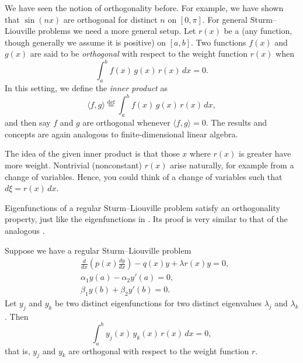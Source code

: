 We have seen the notion of orthogonality before.  For example,
we have shown that $\sin (nx)$ are orthogonal for distinct $n$ on $[0,\pi]$.
For general Sturm--Liouville problems we need a more general setup.
Let $r(x)$
be a \emph{} (any function, though generally we
assume it is positive) on $[a,b]$.  Two functions $f(x)$ and $g(x)$
are said to be
\emph{orthogonal} 
with respect to the weight function
$r(x)$ when
\begin{equation*}
\int_a^b f(x) \, g(x) \, r(x) \,dx = 0 .
\end{equation*}
In this setting,
we define the \emph{inner product} as
\begin{equation*}
\langle f , g \rangle \overset{\text{def}}{=} \int_a^b f(x) \, g(x) \, r(x)
\,dx ,
\end{equation*}
and then say $f$ and $g$ are orthogonal whenever $\langle f , g \rangle = 0$.
The results and concepts are again analogous to 
finite-dimensional linear algebra.

The idea of the given inner product is that those $x$ where $r(x)$
is greater have more weight.
Nontrivial (nonconstant)
$r(x)$ arise naturally, for example from a change of variables.
Hence, you could
think of a change of variables such that $d\xi = r(x)\, dx$.

Eigenfunctions of a
regular Sturm--Liouville problem satisfy an orthogonality property, just
like the eigenfunctions in .
Its proof is very similar to that of the analogous 
.

\begin{theorem}
Suppose we have a regular Sturm--Liouville problem
\begin{align*}
&\frac{d}{dx} \left( p(x) \frac{dy}{dx} \right)
- q(x) y + \lambda r(x) y = 0 , \\
&\alpha_1 y(a) - \alpha_2 y'(a) = 0 , \\
&\beta_1 y(b) + \beta_2 y'(b) = 0 .
\end{align*}
Let $y_j$ and $y_k$ be two distinct eigenfunctions for two
distinct eigenvalues $\lambda_j$ and $\lambda_k$.  Then
\begin{equation*}
\int_a^b y_j(x) \, y_k(x) \, r(x) \,dx = 0,
\end{equation*}
that is, $y_j$ and $y_k$ are orthogonal with respect to the weight function
$r$.
\end{theorem}


